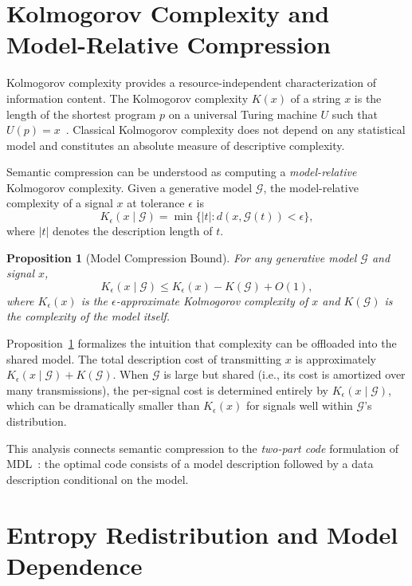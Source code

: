 \documentclass[12pt,a4paper]{article}
\newtheorem{proposition}[theorem]{Proposition}
\theoremstyle{definition}
\theoremstyle{remark}
\begin{document}
\section{Kolmogorov Complexity and Model-Relative Compression}
\label{sec:kolmogorov}

Kolmogorov complexity provides a resource-independent characterization of information content. The Kolmogorov complexity $K(x)$ of a string $x$ is the length of the shortest program $p$ on a universal Turing machine $U$ such that $U(p) = x$~\cite{kolmogorov}. Classical Kolmogorov complexity does not depend on any statistical model and constitutes an absolute measure of descriptive complexity.

Semantic compression can be understood as computing a \emph{model-relative} Kolmogorov complexity. Given a generative model $\mathcal{G}$, the model-relative complexity of a signal $x$ at tolerance $\epsilon$ is
\[
K_\epsilon(x \mid \mathcal{G}) = \min \{ |t| : d(x, \mathcal{G}(t)) < \epsilon \},
\]
where $|t|$ denotes the description length of $t$.

\begin{proposition}[Model Compression Bound]
\label{prop:kolmogorov}
For any generative model $\mathcal{G}$ and signal $x$,
\[
K_\epsilon(x \mid \mathcal{G}) \le K_\epsilon(x) - K(\mathcal{G}) + O(1),
\]
where $K_\epsilon(x)$ is the $\epsilon$-approximate Kolmogorov complexity of $x$ and $K(\mathcal{G})$ is the complexity of the model itself.
\end{proposition}

Proposition~\ref{prop:kolmogorov} formalizes the intuition that complexity can be offloaded into the shared model. The total description cost of transmitting $x$ is approximately $K_\epsilon(x \mid \mathcal{G}) + K(\mathcal{G})$. When $\mathcal{G}$ is large but shared (i.e., its cost is amortized over many transmissions), the per-signal cost is determined entirely by $K_\epsilon(x \mid \mathcal{G})$, which can be dramatically smaller than $K_\epsilon(x)$ for signals well within $\mathcal{G}$'s distribution.

This analysis connects semantic compression to the \emph{two-part code} formulation of MDL~\cite{rissanen}: the optimal code consists of a model description followed by a data description conditional on the model.

\section{Entropy Redistribution and Model Dependence}
\label{sec:entropy}
\end{document}
